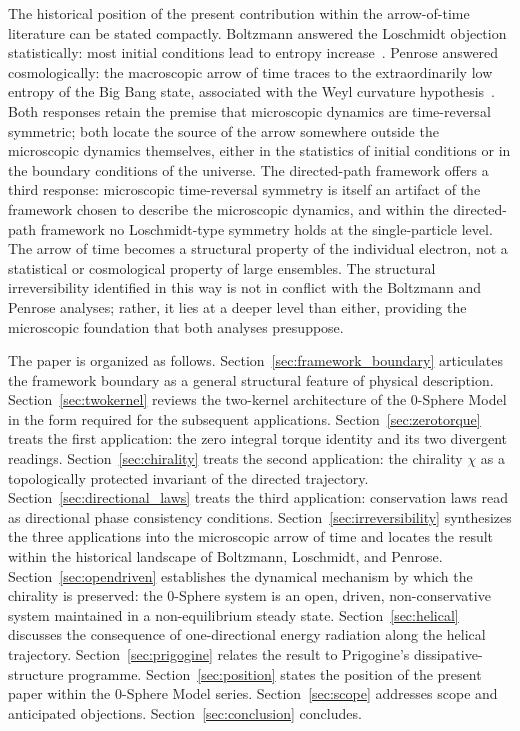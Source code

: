 \documentclass[%
 reprint, amsmath,amssymb, aps, prb, ]{revtex4-2}
\numberwithin{equation}{section}
\begin{document}
The historical position of the present contribution within the arrow-of-time literature can be stated compactly. Boltzmann answered the Loschmidt objection statistically: most initial conditions lead to entropy increase~\cite{Boltzmann1872}. Penrose answered cosmologically: the macroscopic arrow of time traces to the extraordinarily low entropy of the Big Bang state, associated with the Weyl curvature hypothesis~\cite{Penrose1989}. Both responses retain the premise that microscopic dynamics are time-reversal symmetric; both locate the source of the arrow somewhere outside the microscopic dynamics themselves, either in the statistics of initial conditions or in the boundary conditions of the universe. The directed-path framework offers a third response: microscopic time-reversal symmetry is itself an artifact of the framework chosen to describe the microscopic dynamics, and within the directed-path framework no Loschmidt-type symmetry holds at the single-particle level. The arrow of time becomes a structural property of the individual electron, not a statistical or cosmological property of large ensembles. The structural irreversibility identified in this way is not in conflict with the Boltzmann and Penrose analyses; rather, it lies at a deeper level than either, providing the microscopic foundation that both analyses presuppose.

The paper is organized as follows. Section~\ref{sec:framework_boundary} articulates the framework boundary as a general structural feature of physical description. Section~\ref{sec:twokernel} reviews the two-kernel architecture of the 0-Sphere Model in the form required for the subsequent applications. Section~\ref{sec:zerotorque} treats the first application: the zero integral torque identity and its two divergent readings. Section~\ref{sec:chirality} treats the second application: the chirality $\chi$ as a topologically protected invariant of the directed trajectory. Section~\ref{sec:directional_laws} treats the third application: conservation laws read as directional phase consistency conditions. Section~\ref{sec:irreversibility} synthesizes the three applications into the microscopic arrow of time and locates the result within the historical landscape of Boltzmann, Loschmidt, and Penrose. Section~\ref{sec:opendriven} establishes the dynamical mechanism by which the chirality is preserved: the 0-Sphere system is an open, driven, non-conservative system maintained in a non-equilibrium steady state. Section~\ref{sec:helical} discusses the consequence of one-directional energy radiation along the helical trajectory. Section~\ref{sec:prigogine} relates the result to Prigogine's dissipative-structure programme. Section~\ref{sec:position} states the position of the present paper within the 0-Sphere Model series. Section~\ref{sec:scope} addresses scope and anticipated objections. Section~\ref{sec:conclusion} concludes.
\end{document}
